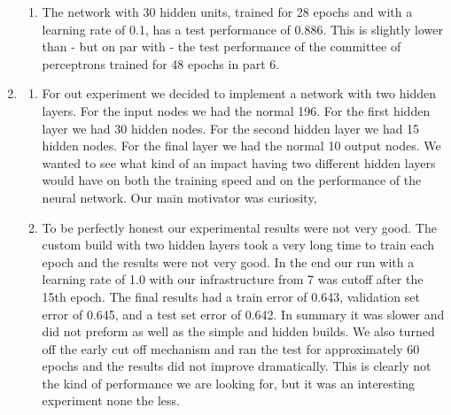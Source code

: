\documentclass[solution, letterpaper]{cs121}
\begin{document}
\begin{enumerate}
\begin{enumerate}
			\item The network with 30 hidden units, trained for 28 epochs and with a learning rate of 0.1, has a test performance of 0.886. This is slightly lower than - but on par with - the test performance of the committee of perceptrons trained for 48 epochs in part 6.
		\end{enumerate}
	\item
		\begin{enumerate}
			\item For out experiment we decided to implement a network with two hidden layers. For the input nodes we had the normal 196. For the first hidden layer we had 30 hidden nodes. For the second hidden layer we had 15 hidden nodes. For the final layer we had the normal 10 output nodes. We wanted to see what kind of an impact having two different hidden layers would have on both the training speed and on the performance of the neural network. Our main motivator was curiosity, 
			\item To be perfectly honest our experimental results were not very good. The custom build with two hidden layers took a very long time to train each epoch and the results were not very good. In the end our run with a learning rate of 1.0 with our infrastructure from 7 was cutoff after the 15th epoch. The final results had a train error of 0.643, validation set error of 0.645, and a test set error of 0.642. In summary it was slower and did not preform as well as the simple and hidden builds. We also turned off the early cut off mechanism and ran the test for approximately 60 epochs  and the results did not improve dramatically. This is clearly not the kind of performance we are looking for, but it was an interesting experiment none the less.   
		\end{enumerate}
\end{enumerate}
\end{document}
